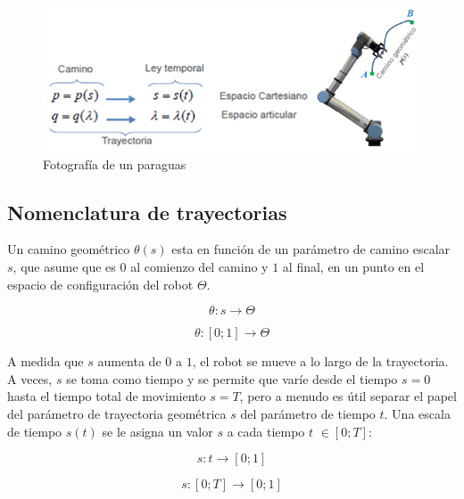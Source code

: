     
    \begin{figure}[htb]
        \centering
        \includegraphics[width=0.7\linewidth]{Main/Chapter4/Images4/cap4_tray_1.png}
        \caption{Fotografía de un paraguas}
        \label{f:Cap4_tray_1}
    \end{figure}    
    
    \newpage
    
    \subsection{Nomenclatura de trayectorias}
        Un camino geométrico $\theta(s)$ esta en función de un parámetro de camino escalar $s$, que asume que es $0$ al comienzo del camino y $1$ al final, en un punto en el espacio de configuración del robot $\Theta$.
        
    \begin{equation}
        \theta: s \rightarrow   \Theta 
        \label{eq:cap4_tray_3}
    \end{equation}  
    
        \begin{equation}
        \theta: [0;1] \rightarrow   \Theta
        \label{eq:cap4_tray_4}
    \end{equation}
    
    A medida que $s$ aumenta de $0$ a $1$, el robot se mueve a lo largo de la trayectoria. A veces, $s$ se toma como tiempo y se permite que varíe desde el tiempo $s=0$ hasta el tiempo total de movimiento $s=T$, pero a menudo es útil separar el papel del parámetro de trayectoria geométrica $s$  del parámetro de tiempo $t$. Una escala de tiempo $s(t)$ se le asigna un valor $s$ a cada tiempo $t$ $ \in [0; T]$:

    \begin{equation}
        s: t \rightarrow   [0;1] 
        \label{eq:cap4_tray_5}
    \end{equation}  
    
        \begin{equation}
        s: [0; T] \rightarrow   [0;1] 
        \label{eq:cap4_tray_6}
    \end{equation}



